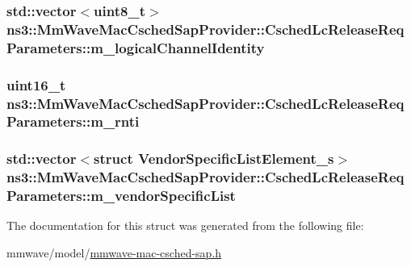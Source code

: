 \subsubsection[{\texorpdfstring{m\+\_\+logical\+Channel\+Identity}{m_logicalChannelIdentity}}]{\setlength{\rightskip}{0pt plus 5cm}std\+::vector$<$uint8\+\_\+t$>$ ns3\+::\+Mm\+Wave\+Mac\+Csched\+Sap\+Provider\+::\+Csched\+Lc\+Release\+Req\+Parameters\+::m\+\_\+logical\+Channel\+Identity}\hypertarget{structns3_1_1MmWaveMacCschedSapProvider_1_1CschedLcReleaseReqParameters_acd7f98450f64502df3b4627328c8a04d}{}\label{structns3_1_1MmWaveMacCschedSapProvider_1_1CschedLcReleaseReqParameters_acd7f98450f64502df3b4627328c8a04d}
\subsubsection[{\texorpdfstring{m\+\_\+rnti}{m_rnti}}]{\setlength{\rightskip}{0pt plus 5cm}uint16\+\_\+t ns3\+::\+Mm\+Wave\+Mac\+Csched\+Sap\+Provider\+::\+Csched\+Lc\+Release\+Req\+Parameters\+::m\+\_\+rnti}\hypertarget{structns3_1_1MmWaveMacCschedSapProvider_1_1CschedLcReleaseReqParameters_a6e122d00d602c81c56f4f90af3a65d6a}{}\label{structns3_1_1MmWaveMacCschedSapProvider_1_1CschedLcReleaseReqParameters_a6e122d00d602c81c56f4f90af3a65d6a}
\subsubsection[{\texorpdfstring{m\+\_\+vendor\+Specific\+List}{m_vendorSpecificList}}]{\setlength{\rightskip}{0pt plus 5cm}std\+::vector$<$struct {\bf Vendor\+Specific\+List\+Element\+\_\+s}$>$ ns3\+::\+Mm\+Wave\+Mac\+Csched\+Sap\+Provider\+::\+Csched\+Lc\+Release\+Req\+Parameters\+::m\+\_\+vendor\+Specific\+List}\hypertarget{structns3_1_1MmWaveMacCschedSapProvider_1_1CschedLcReleaseReqParameters_ac34f1389e047c14412a861a0835f7ee8}{}\label{structns3_1_1MmWaveMacCschedSapProvider_1_1CschedLcReleaseReqParameters_ac34f1389e047c14412a861a0835f7ee8}


The documentation for this struct was generated from the following file\+:\begin{DoxyCompactItemize}
\item 
mmwave/model/\hyperlink{mmwave-mac-csched-sap_8h}{mmwave-\/mac-\/csched-\/sap.\+h}\end{DoxyCompactItemize}
